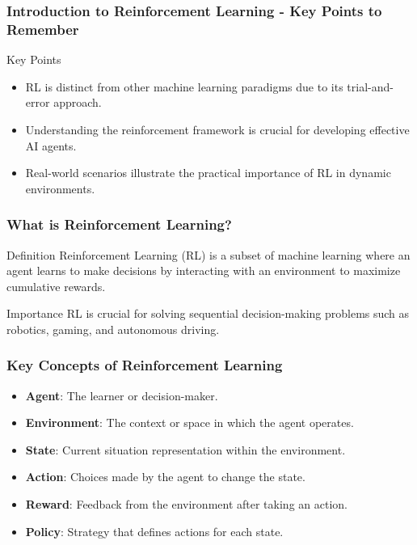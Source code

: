 \documentclass{beamer}
\begin{document}
\begin{frame}[fragile]
    \frametitle{Introduction to Reinforcement Learning - Key Points to Remember}

    \begin{block}{Key Points}
        \begin{itemize}
            \item RL is distinct from other machine learning paradigms due to its trial-and-error approach.
            \item Understanding the reinforcement framework is crucial for developing effective AI agents.
            \item Real-world scenarios illustrate the practical importance of RL in dynamic environments.
        \end{itemize}
    \end{block}

\end{frame}

\begin{frame}[fragile]
    \frametitle{What is Reinforcement Learning?}
    \begin{block}{Definition}
        Reinforcement Learning (RL) is a subset of machine learning where an agent learns to make decisions by interacting with an environment to maximize cumulative rewards.
    \end{block}
    
    \begin{block}{Importance}
        RL is crucial for solving sequential decision-making problems such as robotics, gaming, and autonomous driving.
    \end{block}
\end{frame}

\begin{frame}[fragile]
    \frametitle{Key Concepts of Reinforcement Learning}
    
    \begin{itemize}
        \item \textbf{Agent}: The learner or decision-maker.
        \item \textbf{Environment}: The context or space in which the agent operates.
        \item \textbf{State}: Current situation representation within the environment.
        \item \textbf{Action}: Choices made by the agent to change the state.
        \item \textbf{Reward}: Feedback from the environment after taking an action.
        \item \textbf{Policy}: Strategy that defines actions for each state.
    \end{itemize}
\end{frame}
\end{document}
